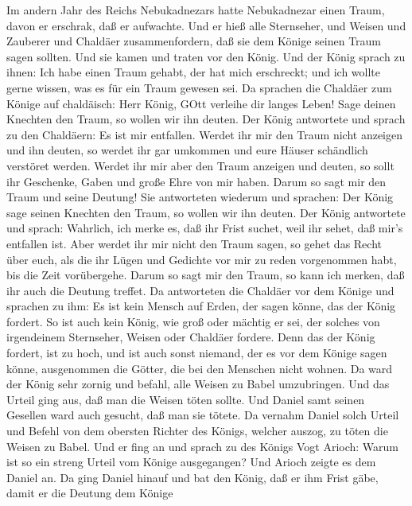  Im andern Jahr des Reichs Nebukadnezars hatte Nebukadnezar
einen Traum, davon er erschrak, daß er aufwachte.  Und er
hieß alle Sternseher, und Weisen und Zauberer und Chaldäer
zusammenfordern, daß sie dem Könige seinen Traum sagen sollten. Und sie
kamen und traten vor den König.  Und der König sprach zu
ihnen: Ich habe einen Traum gehabt, der hat mich erschreckt; und ich
wollte gerne wissen, was es für ein Traum gewesen sei.  Da
sprachen die Chaldäer zum Könige auf chaldäisch: Herr König, GOtt
verleihe dir langes Leben! Sage deinen Knechten den Traum, so wollen wir
ihn deuten.  Der König antwortete und sprach zu den
Chaldäern: Es ist mir entfallen. Werdet ihr mir den Traum nicht anzeigen
und ihn deuten, so werdet ihr gar umkommen und eure Häuser schändlich
verstöret werden.  Werdet ihr mir aber den Traum anzeigen
und deuten, so sollt ihr Geschenke, Gaben und große Ehre von mir haben.
Darum so sagt mir den Traum und seine Deutung!  Sie
antworteten wiederum und sprachen: Der König sage seinen Knechten den
Traum, so wollen wir ihn deuten.  Der König antwortete und
sprach: Wahrlich, ich merke es, daß ihr Frist suchet, weil ihr sehet,
daß mir's entfallen ist.  Aber werdet ihr mir nicht den
Traum sagen, so gehet das Recht über euch, als die ihr Lügen und
Gedichte vor mir zu reden vorgenommen habt, bis die Zeit vorübergehe.
Darum so sagt mir den Traum, so kann ich merken, daß ihr auch die
Deutung treffet.  Da antworteten die Chaldäer vor dem
Könige und sprachen zu ihm: Es ist kein Mensch auf Erden, der sagen
könne, das der König fordert. So ist auch kein König, wie groß oder
mächtig er sei, der solches von irgendeinem Sternseher, Weisen oder
Chaldäer fordere.  Denn das der König fordert, ist zu hoch,
und ist auch sonst niemand, der es vor dem Könige sagen könne,
ausgenommen die Götter, die bei den Menschen nicht wohnen. 
Da ward der König sehr zornig und befahl, alle Weisen zu Babel
umzubringen.  Und das Urteil ging aus, daß man die Weisen
töten sollte. Und Daniel samt seinen Gesellen ward auch gesucht, daß man
sie tötete.  Da vernahm Daniel solch Urteil und Befehl von
dem obersten Richter des Königs, welcher auszog, zu töten die Weisen zu
Babel.  Und er fing an und sprach zu des Königs Vogt
Arioch: Warum ist so ein streng Urteil vom Könige ausgegangen? Und
Arioch zeigte es dem Daniel an.  Da ging Daniel hinauf und
bat den König, daß er ihm Frist gäbe, damit er die Deutung dem Könige
